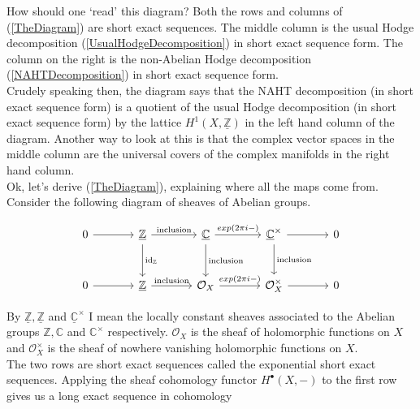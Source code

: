 How should one `read' this diagram? Both the rows and columns of (\ref{TheDiagram}) are short exact sequences. The middle column is the usual Hodge decomposition (\ref{UsualHodgeDecomposition}) in short exact sequence form. The column on the right is the non-Abelian Hodge decomposition (\ref{NAHTDecomposition}) in short exact sequence form.\\

Crudely speaking then, the diagram says that the NAHT decomposition (in short exact sequence form) is a quotient of the usual Hodge decomposition (in short exact sequence form) by the lattice $H^{1}(X,\underline{\mathbb{Z}})$ in the left hand column of the diagram. Another way to look at this is that the complex vector spaces in the middle column are the universal covers of the complex manifolds in the right hand column. \\

Ok, let's derive (\ref{TheDiagram}), explaining where all the maps come from. Consider the following diagram of sheaves of Abelian groups.

\begin{equation}\label{SESDiagram}
\begin{tikzcd}[sep=large]
0 \arrow[r] & \underline{\mathbb{Z}} \arrow[r, "\textrm{inclusion}"] \arrow[d, "\textrm{id}_{\mathbb{Z}}"] & \underline{\mathbb{C}} \arrow[r, "exp(2\pi i - )"] \arrow[d, "\textrm{inclusion}"]  & \underline{\mathbb{C}}^\times \arrow[r] \arrow[d, "\textrm{inclusion}"] & 0\\
0 \arrow[r] & \underline{\mathbb{Z}} \arrow[r, "\textrm{inclusion}"] &  \mathcal{O}_{X}  \arrow[r,"exp(2\pi i - )"] &  \mathcal{O}_{X}^\times \arrow[r] & 0
\end{tikzcd}
\end{equation}





By $\underline{\mathbb{Z}},\underline{\mathbb{Z}}$ and $\underline{\mathbb{C}}^\times$ I mean the locally constant sheaves associated to the Abelian groups $\mathbb{Z},\mathbb{C}$ and $\mathbb{C}^\times$ respectively. $\mathcal{O}_{X}$ is the sheaf of holomorphic functions on $X$ and $\mathcal{O}_{X}^\times$ is the sheaf of nowhere vanishing holomorphic functions on $X$.\\

The two rows are short exact sequences called the exponential short exact sequences. Applying the sheaf cohomology functor $H^ \bullet (X, - )$ to the first row gives us a long exact sequence in cohomology

